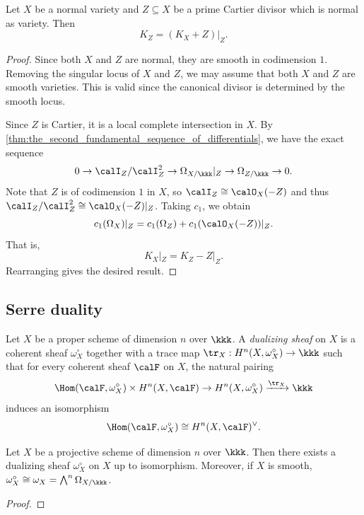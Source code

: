     \begin{corollary}\label{cor:adjunction_formula_smooth_case}
        Let \(X\) be a normal variety and \(Z \subseteq X\) be a prime Cartier divisor which is normal as variety.
        Then 
        \[ K_Z = (K_X + Z)|_Z. \]
    \end{corollary}
    \begin{proof}
        Since both \(X\) and \(Z\) are normal, they are smooth in codimension \(1\).
        Removing the singular locus of \(X\) and \(Z\), we may assume that both \(X\) and \(Z\) are smooth varieties.
        This is valid since the canonical divisor is determined by the smooth locus.

        Since \(Z\) is Cartier, it is a local complete intersection in \(X\).
        By \cref{thm:the_second_fundamental_sequence_of_differentials}, we have the exact sequence
        \[ 0 \to \calI_Z/\calI_Z^2 \to \Omega_{X/\kkk}|_Z \to \Omega_{Z/\kkk} \to 0. \]
        Note that \(Z\) is of codimension \(1\) in \(X\), so \(\calI_Z \cong \calO_X(-Z)\) and thus \(\calI_Z/\calI_Z^2 \cong \calO_X(-Z)|_Z\).
        Taking \(c_1\), we obtain
        \[ c_1(\Omega_{X})|_Z = c_1(\Omega_{Z}) + c_1(\calO_X(-Z))|_Z. \]
        That is,
        \[ K_X|_Z = K_Z - Z|_Z. \]
        Rearranging gives the desired result.
    \end{proof}

\subsection{Serre duality}

    \begin{definition}\label{def:dualizing_sheaf}
        Let \(X\) be a proper scheme of dimension \(n\) over \(\kkk\).
        A \emph{dualizing sheaf} on \(X\) is a coherent sheaf \(\omega_X^\circ\) together with a trace map \(\tr_X: H^n(X, \omega_X^\circ) \to \kkk\) such that for every coherent sheaf \(\calF\) on \(X\), the natural pairing
        \[
            \Hom(\calF, \omega_X^\circ) \times H^n(X, \calF) \to H^n(X, \omega_X^\circ) \xrightarrow{\tr_X} \kkk
        \]
        induces an isomorphism
        \[
            \Hom(\calF, \omega_X^\circ) \cong H^n(X, \calF)^\vee.
        \]
    \end{definition}


    \begin{theorem}\label{thm:existence_of_dualizing_sheaf}
        Let \(X\) be a projective scheme of dimension \(n\) over \(\kkk\).
        Then there exists a dualizing sheaf \(\omega_X^\circ\) on \(X\) up to isomorphism.
        Moreover, if \(X\) is smooth, \(\omega_X^\circ \cong \omega_X = \bigwedge^n \Omega_{X/\kkk}\).
    \end{theorem}
    \begin{proof}
    \end{proof}


